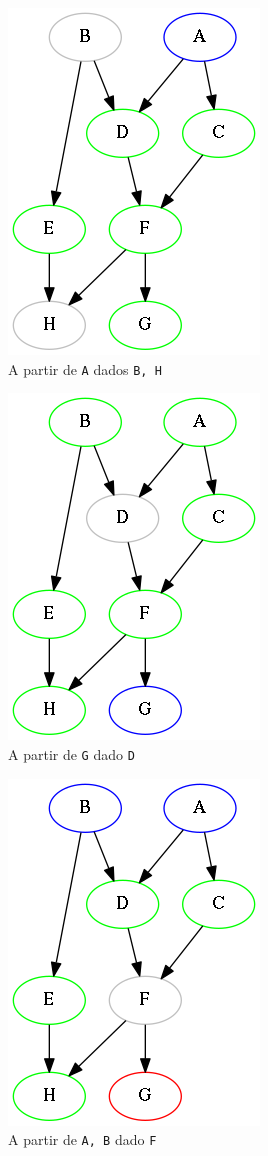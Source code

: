 \documentclass[paper=a4, fontsize=11pt]{scrartcl} %
\numberwithin{equation}{subsection}
\numberwithin{figure}{subsection}
\numberwithin{table}{subsection}
\numberwithin{definition}{subsection}
\numberwithin{theorem}{subsection}
\numberwithin{property}{subsection}
\numberwithin{proposition}{subsection}
\numberwithin{equation}{section}
\numberwithin{figure}{section}
\numberwithin{table}{section}
\numberwithin{definition}{section}
\numberwithin{theorem}{section}
\numberwithin{property}{section}
\numberwithin{proposition}{section}
\begin{document}
\begin{figure}[hbtp]
\centering
\includegraphics[scale=0.5]{images/net4_1_A_giv_BH.png}
\caption{A partir de \texttt{A} dados \texttt{B, H}}
\label{fig:alcancA_BH}
\end{figure}
\begin{figure}[hbtp]
\centering
\includegraphics[scale=0.5]{images/net4_1_G_giv_D.png}
\caption{A partir de \texttt{G} dado \texttt{D}}
\label{fig:alcancG_D}
\end{figure}
\begin{figure}[hbtp]
\centering
\includegraphics[scale=0.5]{images/net4_1_AB_giv_F.png}
\caption{A partir de \texttt{A, B} dado \texttt{F}}
\label{fig:alcancAB_F}
\end{figure}
\end{document}
